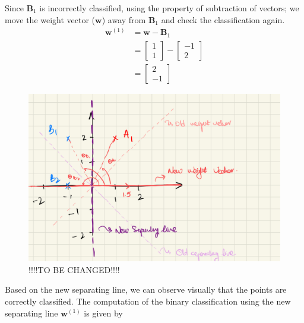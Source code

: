 \noindent Since $\textbf{B}_1$ is incorrectly classified, using the property of subtraction of vectors; we move the weight vector ($\textbf{w}$) away from $\textbf{B}_1$ and check the classification again.
\begin{align}
  \textbf{w}^{(1)} &= \textbf{w} - \textbf{B}_1 \\
  &= \begin{bmatrix}
    1 \\
    1
  \end{bmatrix} - \begin{bmatrix}
    -1 \\
    2
  \end{bmatrix} \\
  & = \begin{bmatrix}
    2 \\
    -1
  \end{bmatrix}
\end{align}
\begin{figure}[H]
  \centering
  \includegraphics[scale=0.20]{CHAPTER_2/c2_fig_perceptron_example_4.jpeg}
  \caption{!!!!TO BE CHANGED!!!!}
  \label{fig:perceptron_example_4}
\end{figure}
\noindent Based on the new separating line, we can observe visually that the points are correctly classified. The computation of the binary classification using the new separating line $\textbf{w}^{(1)}$ is given by
